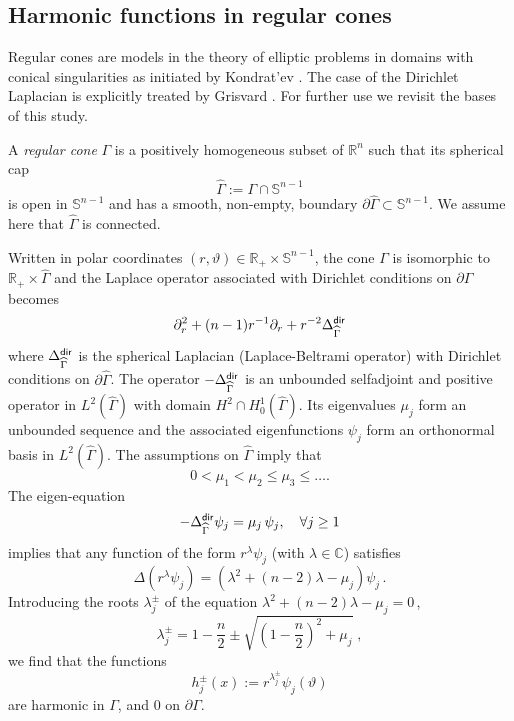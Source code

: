 \documentclass[titlepage,12pt]{amsart}
\theoremstyle{definition}
\theoremstyle{remark}
\numberwithin{equation}{section}
\newcommand\bS{{\mathbb S}}
\newcommand\C{{\mathbb C}}
\newcommand\R{{\mathbb R}}
\begin{document}
\subsection{Harmonic functions in regular cones}
Regular cones are models in the theory of elliptic problems in domains with conical singularities as initiated by Kondrat'ev \cite{Kond:1967}. The case of the Dirichlet Laplacian is explicitly treated by Grisvard \cite{Grisvard:1971}. For further use we revisit the bases of this study.

A {\em regular cone} $\Gamma$ is a positively homogeneous subset of $\R^n$ such that its spherical cap
\[
   \widehat\Gamma := \Gamma\cap\bS^{n-1}
\]
is open in $\bS^{n-1}$ and has a smooth, non-empty, boundary $\partial\widehat\Gamma\subset\bS^{n-1}$. We assume here that $\widehat\Gamma$ is connected.

Written in polar coordinates $(r,\vartheta)\in\R_+\times\bS^{n-1}$, the cone $\Gamma$ is isomorphic to $\R_+\times\widehat\Gamma$ and the Laplace operator associated with Dirichlet conditions on $\partial\Gamma$ becomes
\[
   \partial^2_r + (n-1)r^{-1}\partial_r + r^{-2}\Delta^{\sf dir}_{\widehat\Gamma}
\]
where $\Delta^{\sf dir}_{\widehat\Gamma}$ is the spherical Laplacian (Laplace-Beltrami operator) with Dirichlet conditions on $\partial\widehat\Gamma$.
The operator $-\Delta^{\sf dir}_{\widehat\Gamma}$ is an unbounded selfadjoint and positive operator in $L^{2}(\widehat\Gamma)$ with domain $H^2\cap H^1_0(\widehat\Gamma)$. Its eigenvalues $\mu_j$ form an unbounded sequence and the associated eigenfunctions $\psi_j$ form an orthonormal basis in $L^2(\widehat\Gamma)$. The assumptions on $\widehat\Gamma$ imply that
\begin{equation}
\label{eq:muj}
   0 < \mu_1 <  \mu_2 \le \mu_3 \le \ldots .
\end{equation}
The eigen-equation
\[
   -\Delta^{\sf dir}_{\widehat\Gamma} \psi_j = \mu_j\,\psi_j,\quad \forall j\ge1
\]
implies that any function of the form $r^\lambda\psi_j$ (with $\lambda\in\C$) satisfies
\[
   \Delta(r^\lambda\psi_j) = (\lambda^2+(n-2)\lambda - \mu_j)\psi_j\,.
\]
Introducing the roots $\lambda_j^\pm$ of the equation  $\lambda^2+(n-2)\lambda - \mu_j = 0$\,,
\begin{equation}
\label{eq:lj}
  \lambda_j^\pm = 1-\frac{n}{2} \pm \sqrt{\left(1-\frac{n}{2}\right)^2 + \mu_j}\;,
\end{equation}
we find that the functions
\begin{equation}
\label{eq:hj}
   h_j^\pm(x) := r^{\lambda_j^\pm} \psi_j(\vartheta)
\end{equation}
are harmonic in $\Gamma$, and $0$ on $\partial\Gamma$. 
\end{document}
